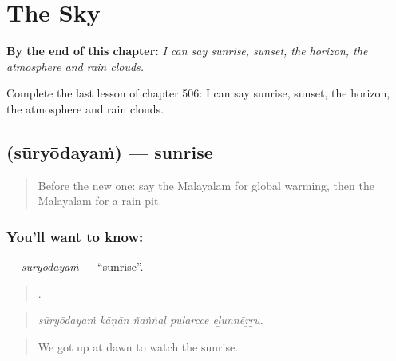 
\chapter{The Sky}
\label{ch:ml-the-sky}

\begin{chapteropening}
\textbf{By the end of this chapter:} \emph{I can say sunrise, sunset, the horizon, the atmosphere and rain clouds.}

Complete the last lesson of chapter 506: I can say sunrise, sunset, the horizon, the atmosphere and rain clouds.
\end{chapteropening}

\section[\texorpdfstring{\ml{സൂര്യോദയം} (sūryōdayaṁ)}{സൂര്യോദയം (sūryōdayaṁ)}]{ (sūryōdayaṁ) — sunrise}

\label{lesson:ML-C506-suryodayam}



\begin{quote}
Before the new one: say the Malayalam for global warming, then the Malayalam for a rain pit.
\end{quote}

\subsection*{You'll want to know: }
\textbf{} — \emph{sūryōdayaṁ} — \textquotedblleft{}sunrise\textquotedblright{}.

\begin{quote}
    .
\end{quote}

\begin{quote}
\emph{sūryōdayaṁ kāṇān ñaṅṅaḷ pularcce eḻunnēṟṟu.}
\end{quote}

\begin{quote}
We got up at dawn to watch the sunrise.
\end{quote}

